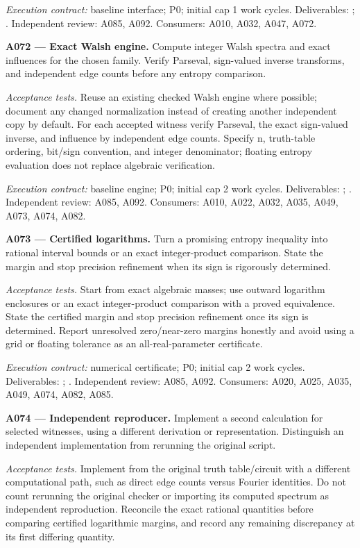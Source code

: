 \documentclass[11pt]{article}
\begin{document}
{\small\emph{Execution contract:} baseline interface; P0; initial cap 1 work cycles. Deliverables: ; . Independent review: A085, A092. Consumers: A010, A032, A047, A072.}

\textbf{A072 --- Exact Walsh engine.} Compute integer Walsh spectra and exact influences for the chosen family. Verify Parseval, sign-valued inverse transforms, and independent edge counts before any entropy comparison.

\emph{Acceptance tests.} Reuse an existing checked Walsh engine where possible; document any changed normalization instead of creating another independent copy by default. For each accepted witness verify Parseval, the exact sign-valued inverse, and influence by independent edge counts. Specify n, truth-table ordering, bit/sign convention, and integer denominator; floating entropy evaluation does not replace algebraic verification.

{\small\emph{Execution contract:} baseline engine; P0; initial cap 2 work cycles. Deliverables: ; . Independent review: A085, A092. Consumers: A010, A022, A032, A035, A049, A073, A074, A082.}

\textbf{A073 --- Certified logarithms.} Turn a promising entropy inequality into rational interval bounds or an exact integer-product comparison. State the margin and stop precision refinement when its sign is rigorously determined.

\emph{Acceptance tests.} Start from exact algebraic masses; use outward logarithm enclosures or an exact integer-product comparison with a proved equivalence. State the certified margin and stop precision refinement once its sign is determined. Report unresolved zero/near-zero margins honestly and avoid using a grid or floating tolerance as an all-real-parameter certificate.

{\small\emph{Execution contract:} numerical certificate; P0; initial cap 2 work cycles. Deliverables: ; . Independent review: A085, A092. Consumers: A020, A025, A035, A049, A074, A082, A085.}

\textbf{A074 --- Independent reproducer.} Implement a second calculation for selected witnesses, using a different derivation or representation. Distinguish an independent implementation from rerunning the original script.

\emph{Acceptance tests.} Implement from the original truth table/circuit with a different computational path, such as direct edge counts versus Fourier identities. Do not count rerunning the original checker or importing its computed spectrum as independent reproduction. Reconcile the exact rational quantities before comparing certified logarithmic margins, and record any remaining discrepancy at its first differing quantity.
\end{document}
